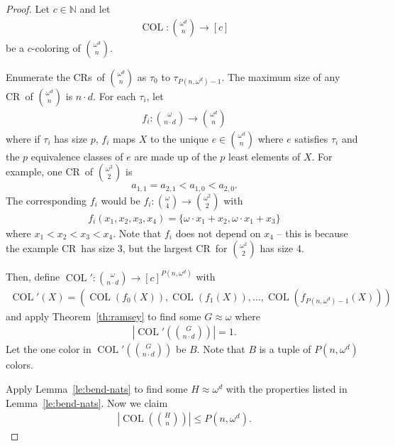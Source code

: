 \documentclass[10pt,a4paper]{article}
\newcommand{\om}{\omega}
\newcommand{\oequiv}{\approx}
\newcommand{\COL}{\operatorname{COL}}
\newcommand{\N}{\mathbb{N}}
\newcommand{\crulenospace}{CR}
\newcommand{\crule}{\crulenospace~}
\newcommand{\crules}{\crulenospace s~}
\newcommand{\numpoints}{n}
\newcommand{\numcolors}{c}
\newcommand{\commonconst}{a}
\newcommand{\Rareconst}{B}
\theoremstyle{plain}
\theoremstyle{definition}
\begin{document}
\begin{proof}
Let $\numcolors \in \N$ and let \begin{align*}
    \COL \colon \binom{\om^d}{\numpoints} \to [\numcolors]
\end{align*}
be a $\numcolors$-coloring of $\binom{\om^d}{\numpoints}$. 

Enumerate the \crules of $\binom{\om^d}{\numpoints}$ as $\tau_0$ to $\tau_{P(\numpoints, \om^d)-1}$. The maximum size of any \crule of $\binom{\om^d}{\numpoints}$ is $\numpoints \cdot d$. For each $\tau_i$, let \begin{align*}
    f_i \colon \binom{\om}{\numpoints \cdot d} \to \binom{\om^d}{\numpoints}
\end{align*}
where if $\tau_i$ has size $p$, $f_i$ maps $X$ to the unique $e \in \binom{\om^d}{\numpoints}$ where $e$ satisfies $\tau_i$ and the $p$ equivalence classes of $e$ are made up of the $p$ least elements of $X$. For example, one \crule of $\binom{\om^2}{2}$ is $$
\commonconst_{1, 1} = \commonconst_{2, 1} < \commonconst_{1, 0} < \commonconst_{2, 0}.
$$ The corresponding $f_i$ would be $f_i \colon \binom{\om}{4} \to \binom{\om^2}{2}$ with \begin{align*}
f_i(x_1,x_2,x_3,x_4) = \{\om \cdot x_1 + x_2, \om \cdot x_1 + x_3\}
\end{align*} where $x_1 < x_2 < x_3 < x_4$. Note that $f_i$ does not depend on $x_4$ -- this is because the example \crule has size 3, but the largest \crule for $\binom{\om^2}{2}$ has size 4.

Then, define $\COL' \colon \binom{\om}{\numpoints \cdot d} \to [\numcolors]^{P(\numpoints,\om^d)}$ with \begin{align*}
    \COL'(X) = (\COL(f_0(X)),\COL(f_1(X)),\ldots,\COL(f_{P(\numpoints, \om^d)-1}(X)))
\end{align*}
and apply Theorem~\ref{th:ramsey} to find some $G \oequiv \om$ where
\begin{align*}
 \left |  \COL' \left( \binom{G}{\numpoints \cdot d} \right)\right | = 1.
\end{align*}
Let the one color in $\COL'\left(\binom{G}{\numpoints \cdot d}\right)$ be $\Rareconst$.
Note that $\Rareconst$ is a tuple of $P(\numpoints, \om^d)$ colors.

Apply Lemma~\ref{le:bend-nats} to find some $H \oequiv \om^d$ with the properties listed in Lemma~\ref{le:bend-nats}. Now we claim \begin{align*}
    \left | \COL \left( \binom{H}{\numpoints} \right)\right |\leq P(\numpoints, \om^d).
\end{align*}


\end{proof}
\end{document}
